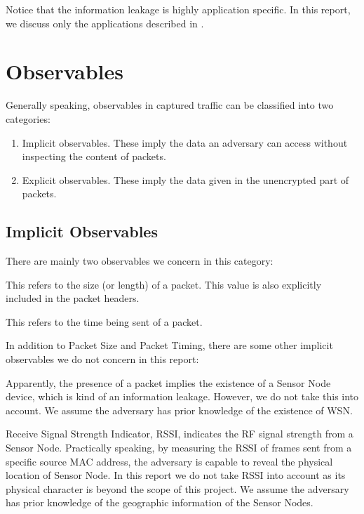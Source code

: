 Notice that the information leakage is highly application specific. In this report, we discuss only the applications described in . 

\section{Observables} \label{Sec: Observables}

Generally speaking, observables in captured traffic can be classified into two categories:
\begin{enumerate}
	\item Implicit observables. These imply the data an adversary can access without inspecting the content of packets.
	\item Explicit observables. These imply the data given in the unencrypted part of packets.
\end{enumerate}

\subsection{Implicit Observables}

There are mainly two observables we concern in this category:

\begin{description}[style=nextline]
	\item[Packet Size] 
	This refers to the size (or length) of a packet. This value is also explicitly included in the packet headers.
	
	\item[Packet Timing]
	This refers to the time being sent of a packet. 
\end{description}

In addition to Packet Size and Packet Timing, there are some other implicit observables we do not concern in this report:

\begin{description}[style=nextline]
	\item[Presence of Packets]
	Apparently, the presence of a packet implies the existence of a Sensor Node device, which is kind of an information leakage. However, we do not take this into account. We assume the adversary has prior knowledge of the existence of WSN.
	
	\item[RSSI]
	Receive Signal Strength Indicator, RSSI, indicates the RF signal strength from a Sensor Node. Practically speaking, by measuring the RSSI of frames sent from a specific source MAC address, the adversary is capable to reveal the physical location of Sensor Node. In this report we do not take RSSI into account as its physical character is beyond the scope of this project. We assume the adversary has prior knowledge of the geographic information of the Sensor Nodes.
\end{description}

